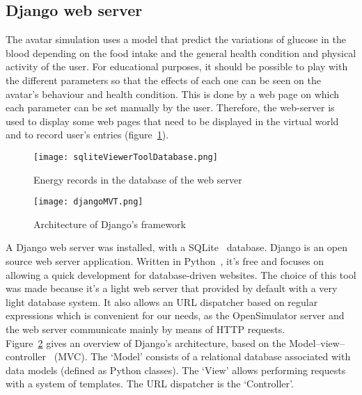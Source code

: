 \subsection{Django web server}
The avatar simulation uses a model that predict the variations of glucose in the blood depending on the food intake and the general health condition and  physical activity of the user. For educational purposes, it should be possible to play with the different parameters so that the effects of each one can be seen on the avatar's behaviour and health condition. This is done by a web page on which each parameter can be set manually by the user.
Therefore, the web-server is used to display some web pages that need to be displayed in the virtual world and to record user's entries (figure~\ref{fig:sqliteViewerToolDatabase}).\\


\begin{figure}[!h]
  \caption{Energy records in the database of the web server}
  \centering
  \texttt{[image: sqliteViewerToolDatabase.png]}
  \label{fig:sqliteViewerToolDatabase}
\end{figure}

\begin{figure}[!h]
  \caption{Architecture of Django's framework}
  \centering
  \texttt{[image: djangoMVT.png]}
  \label{fig:djangoMVT}
\end{figure}


A Django web server was installed, with a SQLite~\cite{sqliteWebsite} database. Django is an open source web server application. Written in Python~\cite{pythonWebsite}, it's free and focuses on allowing a quick development for database-driven websites. 
The choice of this tool was made because it's a light web server that provided by default with a very light database system. It also allows an URL dispatcher based on regular expressions which is convenient for our needs, as the OpenSimulator server and the web server communicate mainly by means of HTTP requests.\\

Figure~\ref{fig:djangoMVT} gives an overview of Django's architecture, based on the Model–view–controller~\cite{deacon2009model} (MVC). The `Model' consists of a relational database associated with data models (defined as Python classes). The `View' allows performing requests with a system of templates. The URL dispatcher is the `Controller'.
